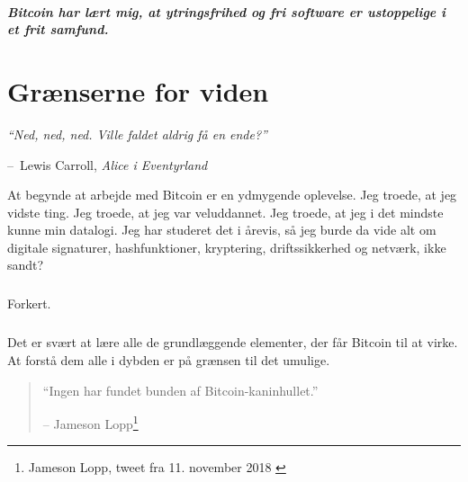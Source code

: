 \documentclass[paper=6in:9in,pagesize=pdftex,
               headinclude=on,footinclude=on,12pt]{scrbook}
\makeatletter
\newenvironment{chapquote}[2][4em]{\setlength{\@tempdima}{#1}%
   \def\chapquote@author{#2}%
   \parshape 1 \@tempdima \dimexpr\textwidth-2\@tempdima\relax%
   \itshape}{\par\normalfont\hfill--\ \chapquote@author\hspace*{\@tempdima}\par\bigskip}
\makeatother
\begin{document}
\paragraph{Bitcoin har lært mig, at ytringsfrihed og fri software er ustoppelige i et frit samfund.}%
%
%
%
%
%
%
%

\chapter{Grænserne for viden}
\label{les:7}

\begin{chapquote}{Lewis Carroll, \textit{Alice i Eventyrland}} \enquote{Ned, ned, ned. Ville faldet aldrig få en ende?} \end{chapquote}

At begynde at arbejde med Bitcoin er en ydmygende oplevelse. Jeg troede, at jeg vidste ting. Jeg troede, at jeg var veluddannet. Jeg troede, at jeg i det mindste kunne min datalogi. Jeg har studeret det i årevis, så jeg burde da vide alt om digitale signaturer, hashfunktioner, kryptering, driftssikkerhed og netværk, ikke sandt?\paragraph{} Forkert.\paragraph{} Det er svært at lære alle de grundlæggende elementer, der får Bitcoin til at virke. At forstå dem alle i dybden er på grænsen til det umulige.\begin{quotation}\begin{samepage} \enquote{Ingen har fundet bunden af Bitcoin-kaninhullet.} \begin{flushright} -- Jameson Lopp\footnote{Jameson Lopp, tweet fra 11. november 2018 \cite{lopp-tweet}}
\end{flushright}\end{samepage}\end{quotation}
\end{document}
